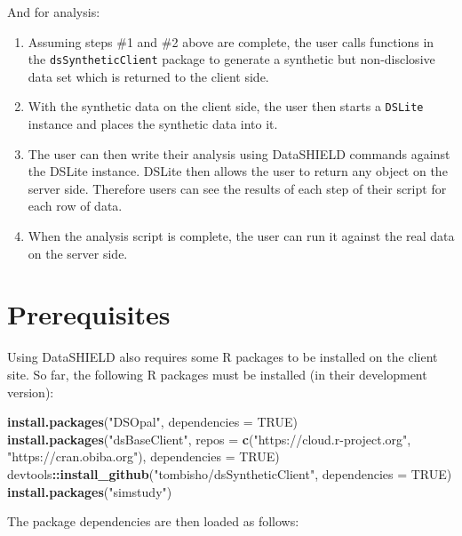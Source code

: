 \documentclass[
]{book}
\newenvironment{Shaded}{\begin{snugshade}}{\end{snugshade}}
\newcommand{\DataTypeTok}[1]{\textcolor[rgb]{0.13,0.29,0.53}{#1}}
\newcommand{\KeywordTok}[1]{\textcolor[rgb]{0.13,0.29,0.53}{\textbf{#1}}}
\newcommand{\NormalTok}[1]{#1}
\newcommand{\OperatorTok}[1]{\textcolor[rgb]{0.81,0.36,0.00}{\textbf{#1}}}
\newcommand{\OtherTok}[1]{\textcolor[rgb]{0.56,0.35,0.01}{#1}}
\newcommand{\StringTok}[1]{\textcolor[rgb]{0.31,0.60,0.02}{#1}}
\providecommand{\tightlist}{%
  \setlength{\itemsep}{0pt}\setlength{\parskip}{0pt}}
\begin{document}
And for analysis:

\begin{enumerate}
\def\labelenumi{\arabic{enumi}.}
\tightlist
\item
  Assuming steps \#1 and \#2 above are complete, the user calls functions in the \texttt{dsSyntheticClient} package to generate a synthetic but non-disclosive data set which is returned to the client side.
\item
  With the synthetic data on the client side, the user then starts a \texttt{DSLite} instance and places the synthetic data into it.
\item
  The user can then write their analysis using DataSHIELD commands against the DSLite instance. DSLite then allows the user to return any object on the server side. Therefore users can see the results of each step of their script for each row of data.
\item
  When the analysis script is complete, the user can run it against the real data on the server side.
\end{enumerate}

\hypertarget{prerequisites-1}{%
\section{Prerequisites}\label{prerequisites-1}}

Using DataSHIELD also requires some R packages to be installed on the client site. So far, the following R packages must be installed (in their development version):

\begin{Shaded}
\begin{Highlighting}[]
\KeywordTok{install.packages}\NormalTok{(}\StringTok{"DSOpal"}\NormalTok{, }\DataTypeTok{dependencies =} \OtherTok{TRUE}\NormalTok{)}
\KeywordTok{install.packages}\NormalTok{(}\StringTok{"dsBaseClient"}\NormalTok{, }\DataTypeTok{repos =} \KeywordTok{c}\NormalTok{(}\StringTok{"https://cloud.r-project.org"}\NormalTok{, }\StringTok{"https://cran.obiba.org"}\NormalTok{), }\DataTypeTok{dependencies =} \OtherTok{TRUE}\NormalTok{)}
\NormalTok{devtools}\OperatorTok{::}\KeywordTok{install_github}\NormalTok{(}\StringTok{"tombisho/dsSyntheticClient"}\NormalTok{, }\DataTypeTok{dependencies =} \OtherTok{TRUE}\NormalTok{)}
\KeywordTok{install.packages}\NormalTok{(}\StringTok{"simstudy"}\NormalTok{)}
\end{Highlighting}
\end{Shaded}

The package dependencies are then loaded as follows:
\end{document}
